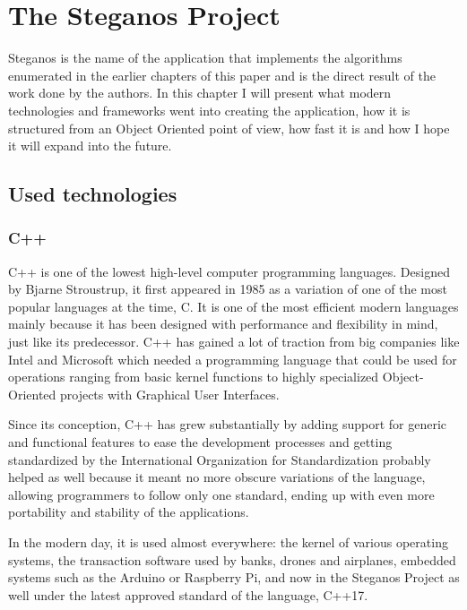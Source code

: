 
\chapter{The Steganos Project}
Steganos is the name of the application that implements the algorithms enumerated in the earlier chapters of this paper and is the direct result of the work done by the authors. In this chapter I will present what modern technologies and frameworks went into creating the application, how it is structured from an Object Oriented point of view, how fast it is and how I hope it will expand into the future.

\section{Used technologies}
\subsection{C++}
C++ is one of the lowest high-level computer programming languages. Designed by Bjarne Stroustrup, it first appeared in 1985 as a variation of one of the most popular languages at the time, C. It is one of the most efficient modern languages mainly because it has been designed with performance and flexibility in mind, just like its predecessor. C++ has gained a lot of traction  from big companies like Intel and Microsoft which needed a programming language that could be used for operations ranging from basic kernel functions to highly specialized Object-Oriented projects with Graphical User Interfaces\cite{stroustrup_2018}.

Since its conception, C++ has grew substantially by adding support for generic and functional features to ease the development processes and getting standardized by the International Organization for Standardization probably helped as well because it meant no more obscure variations of the language, allowing programmers to follow only one standard, ending up with even more portability and stability of the applications.

In the modern day, it is used almost everywhere: the kernel of various operating systems, the transaction software used by banks, drones and airplanes, embedded systems such as the Arduino or Raspberry Pi, and now in the Steganos Project as well under the latest approved standard of the language, C++17.

